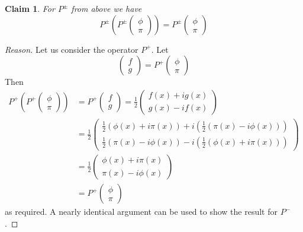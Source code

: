 \documentclass[12pt,oneside]{article}
\newtheorem{claim}{Claim}
\begin{document}
\begin{claim}
For $P^{\pm}$ from above we have
\begin{equation}
P^{\pm}\left(P^{\pm}\begin{pmatrix}\phi \\ \pi\end{pmatrix}\right)=P^{\pm}\begin{pmatrix}\phi \\ \pi\end{pmatrix}
\end{equation}
\end{claim}
\begin{proof}[Reason]
Let us consider the operator $P^{+}$. Let \begin{equation}
\begin{pmatrix}f\\ g\end{pmatrix}=P^{+}\begin{pmatrix}\phi\\ \pi\end{pmatrix}
\end{equation}
Then \begin{align*}
P^{+}\left(P^{+}\begin{pmatrix}\phi \\ \pi\end{pmatrix}\right)&=P^{+}\begin{pmatrix}f\\ g\end{pmatrix}=\frac{1}{2}\begin{pmatrix}f(x)+ig(x)\\ g(x)-if(x)\end{pmatrix}\\
&=\frac{1}{2}\begin{pmatrix}\frac{1}{2}(\phi(x)+i\pi(x))+i(\frac{1}{2}(\pi(x)-i\phi(x)))\\ \frac{1}{2}(\pi(x)-i\phi(x))-i(\frac{1}{2}(\phi(x)+i\pi(x)))\end{pmatrix}\\
&=\frac{1}{2}\begin{pmatrix}\phi(x)+i\pi(x)\\ \pi(x)-i\phi(x)\end{pmatrix}\\
&=P^{+}\begin{pmatrix}
\phi \\ \pi
\end{pmatrix}
\end{align*}
as required. A nearly identical argument can be used to show the
result for $P^{-}$.
\end{proof}
\end{document}
